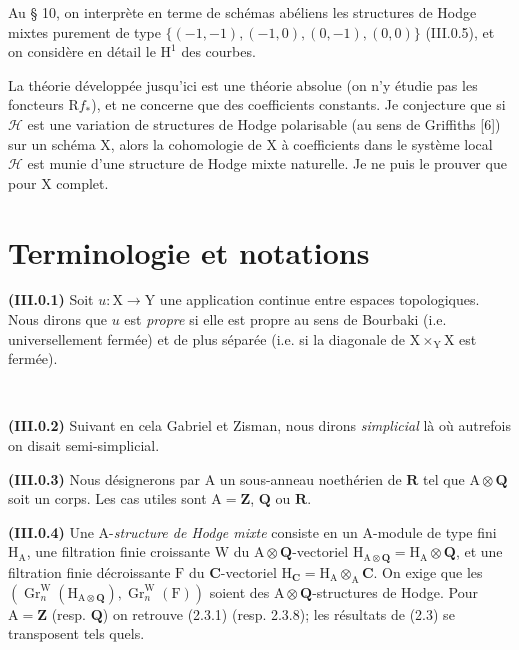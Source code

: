 \documentclass[11pt,leqno]{article}
\newcommand{\Page}[1]{\ifvmode\noindent\else\unskip\ \fi{\footnotesize\textcolor{gray}{[p.\,#1]}}\ \ignorespaces}
\begin{document}
Au § 10, on interprète en terme de schémas abéliens les structures de Hodge mixtes purement de type \(\{(-1,-1),(-1,0),(0,-1),(0,0)\}\) (III.0.5), et on considère en détail le \(\mathrm{H}^{1}\) des courbes.

La théorie développée jusqu’ici est une théorie absolue (on n’y étudie pas les foncteurs \(\mathrm{R}f_*\)), et ne concerne que des coefficients constants. Je conjecture que si \(\mathscr{H}\) est une variation de structures de Hodge polarisable (au sens de Griffiths [6]) sur un schéma \(\mathrm{X}\), alors la cohomologie de \(\mathrm{X}\) à coefficients dans le système local \(\mathscr{H}\) est munie d’une structure de Hodge mixte naturelle. Je ne puis le prouver que pour \(\mathrm{X}\) complet.

\section*{\centering Terminologie et notations}

\textbf{(III.0.1)} Soit \(u:\mathrm{X}\to\mathrm{Y}\) une application continue entre espaces topologiques. Nous dirons que \(u\) est \textit{propre} si elle est propre au sens de Bourbaki (i.e. universellement fermée) et de plus séparée (i.e. si la diagonale de \(\mathrm{X}\times_{\mathrm{Y}}\mathrm{X}\) est fermée).

\Page{8}

\textbf{(III.0.2)} Suivant en cela Gabriel et Zisman, nous dirons \textit{simplicial} là où autrefois on disait semi-simplicial.

\textbf{(III.0.3)} Nous désignerons par \(\mathrm{A}\) un sous-anneau noethérien de \(\mathbf{R}\) tel que \(\mathrm{A}\otimes\mathbf{Q}\) soit un corps. Les cas utiles sont \(\mathrm{A}=\mathbf{Z}\), \(\mathbf{Q}\) ou \(\mathbf{R}\).

\textbf{(III.0.4)} Une \(\mathrm{A}\)-\textit{structure de Hodge mixte} consiste en un \(\mathrm{A}\)-module de type fini \(\mathrm{H}_{\mathrm{A}}\), une filtration finie croissante \(\mathrm{W}\) du \(\mathrm{A}\otimes\mathbf{Q}\)-vectoriel \(\mathrm{H}_{\mathrm{A}\otimes\mathbf{Q}}=\mathrm{H}_{\mathrm{A}}\otimes\mathbf{Q}\), et une filtration finie décroissante \(\mathrm{F}\) du \(\mathbf{C}\)-vectoriel \(\mathrm{H}_{\mathbf{C}}=\mathrm{H}_{\mathrm{A}}\otimes_{\mathrm{A}}\mathbf{C}\). On exige que les \((\operatorname{Gr}^{\mathrm{W}}_n(\mathrm{H}_{\mathrm{A}\otimes\mathbf{Q}}),\operatorname{Gr}^{\mathrm{W}}_n(\mathrm{F}))\) soient des \(\mathrm{A}\otimes\mathbf{Q}\)-structures de Hodge. Pour \(\mathrm{A}=\mathbf{Z}\) (resp. \(\mathbf{Q}\)) on retrouve (2.3.1) (resp. 2.3.8); les résultats de (2.3) se transposent tels quels.
\end{document}
